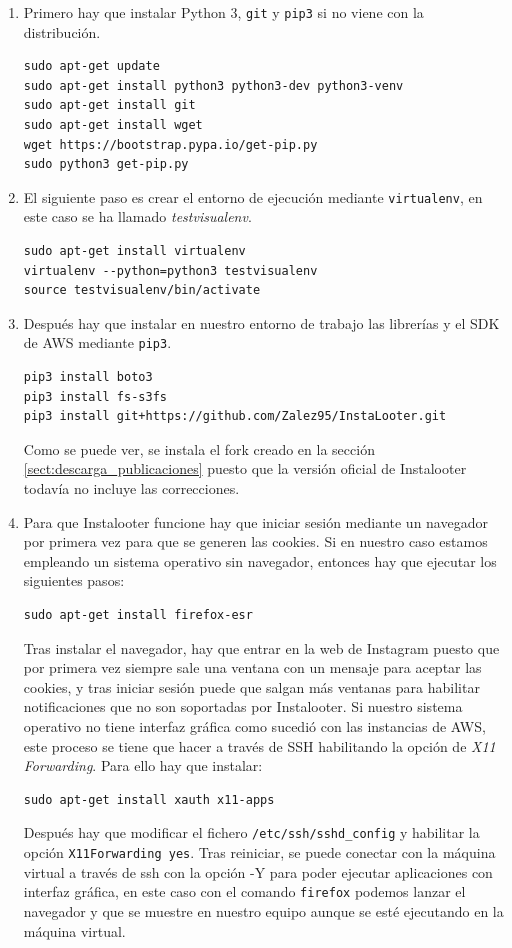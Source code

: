 \begin{enumerate}
    \item Primero hay que instalar Python 3, \texttt{git} y \texttt{pip3} si no viene con la distribución.
\begin{verbatim}
sudo apt-get update
sudo apt-get install python3 python3-dev python3-venv
sudo apt-get install git
sudo apt-get install wget
wget https://bootstrap.pypa.io/get-pip.py
sudo python3 get-pip.py
\end{verbatim}
    
    \item El siguiente paso es crear el entorno de ejecución mediante \texttt{virtualenv}, en este caso se ha llamado \textit{testvisualenv}.
\begin{verbatim}
sudo apt-get install virtualenv
virtualenv --python=python3 testvisualenv
source testvisualenv/bin/activate
\end{verbatim}
    
    \item Después hay que instalar en nuestro entorno de trabajo las librerías y el SDK de AWS mediante \texttt{pip3}.
\begin{verbatim}
pip3 install boto3
pip3 install fs-s3fs
pip3 install git+https://github.com/Zalez95/InstaLooter.git
\end{verbatim}
    Como se puede ver, se instala el fork creado en la sección \ref{sect:descarga_publicaciones} puesto que la versión oficial de Instalooter todavía no incluye las correcciones.
    
    \item Para que Instalooter funcione hay que iniciar sesión mediante un navegador por primera vez para que se generen las cookies. Si en nuestro caso estamos empleando un sistema operativo sin navegador, entonces hay que ejecutar los siguientes pasos:
\begin{verbatim}
sudo apt-get install firefox-esr
\end{verbatim}
    Tras instalar el navegador, hay que entrar en la web de Instagram puesto que por primera vez siempre sale una ventana con un mensaje para aceptar las cookies, y tras iniciar sesión puede que salgan más ventanas para habilitar notificaciones que no son soportadas por Instalooter. Si nuestro sistema operativo no tiene interfaz gráfica como sucedió con las instancias de AWS, este proceso se tiene que hacer a través de SSH habilitando la opción de \textit{X11 Forwarding}. Para ello hay que instalar:
\begin{verbatim}
sudo apt-get install xauth x11-apps
\end{verbatim}
    Después hay que modificar el fichero \texttt{/etc/ssh/sshd\_config} y habilitar la opción \texttt{X11Forwarding yes}. Tras reiniciar, se puede conectar con la máquina virtual a través de ssh con la opción -Y para poder ejecutar aplicaciones con interfaz gráfica, en este caso con el comando \texttt{firefox} podemos lanzar el navegador y que se muestre en nuestro equipo aunque se esté ejecutando en la máquina virtual.
\end{enumerate}

